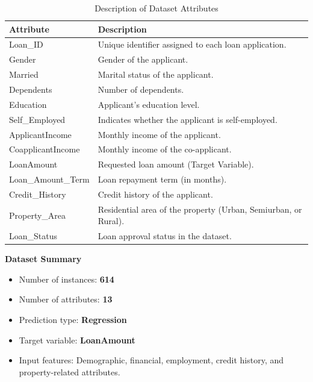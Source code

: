 \documentclass{article}
\begin{document}
\begin{table}[H]
\centering
\renewcommand{\arraystretch}{1.25}
\begin{tabular}{|p{4cm}|p{10.5cm}|}
\hline
\textbf{Attribute} & \textbf{Description} \\ \hline

Loan\_ID &
Unique identifier assigned to each loan application.  \\ \hline

Gender &
Gender of the applicant. \\ \hline

Married &
Marital status of the applicant. \\ \hline

Dependents &
Number of dependents. \\ \hline

Education &
Applicant's education level. \\ \hline

Self\_Employed &
Indicates whether the applicant is self-employed. \\ \hline

ApplicantIncome &
Monthly income of the applicant. \\ \hline

CoapplicantIncome &
Monthly income of the co-applicant. \\ \hline

LoanAmount &
Requested loan amount (Target Variable). \\ \hline

Loan\_Amount\_Term &
Loan repayment term (in months). \\ \hline

Credit\_History &
Credit history of the applicant. \\ \hline

Property\_Area &
Residential area of the property (Urban, Semiurban, or Rural). \\ \hline

Loan\_Status &
Loan approval status in the dataset. \\ \hline

\end{tabular}
\caption{Description of Dataset Attributes}
\label{tab:dataset}
\end{table}
\newpage
\noindent \textbf{Dataset Summary} 
\begin{itemize} 
    \item Number of instances: \textbf{614} 
    \item Number of attributes: \textbf{13} 
    \item Prediction type: \textbf{Regression} 
    \item Target variable: \textbf{LoanAmount} 
    \item Input features: Demographic, financial, employment, credit history, and property-related attributes. 
\end{itemize}
\end{document}
